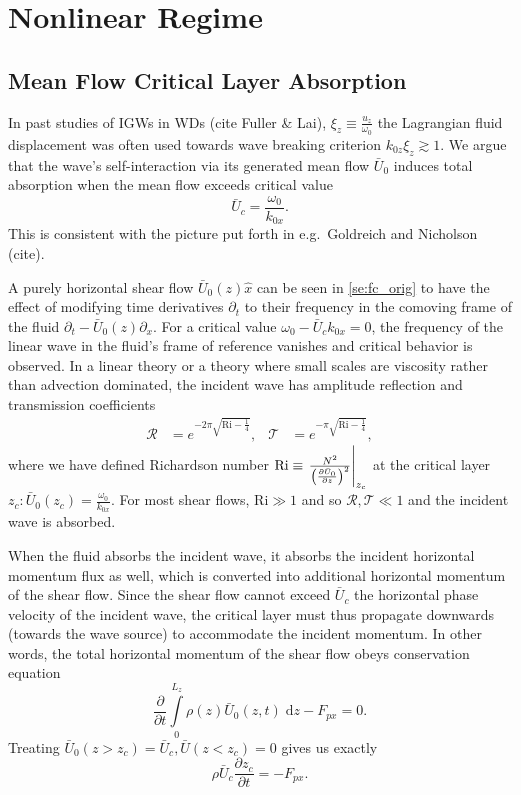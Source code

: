\documentclass[twocolumn,
        nofootinbib,
        usenames, %
        dvipsnames %
    ]{revtex4-1}%
\newcommand*{\pd}[2]{\frac{\partial#1}{\partial#2}}
\newcommand*{\at}[1]{\left.#1\right|}
\DeclarePairedDelimiter\p{\lparen}{\rparen}
\begin{document}
\section{Nonlinear Regime}\label{s:nonlin}

\subsection{Mean Flow Critical Layer Absorption}

In past studies of IGWs in WDs (cite Fuller \& Lai), $\xi_z \equiv
\frac{u_z}{\omega_0}$ the Lagrangian fluid displacement was often used towards
wave breaking criterion $k_{0z}\xi_z \gtrsim 1$. We argue that the wave's
self-interaction via its generated mean flow $\bar{U}_0$ induces total
absorption when the mean flow exceeds critical value
\begin{equation}
    \bar{U}_c = \frac{\omega_0}{k_{0x}}.
\end{equation}
This is consistent with the picture put forth in e.g.\ Goldreich and Nicholson
(cite).

A purely horizontal shear flow $\bar{U}_0(z) \hat{x}$ can be seen in
\autoref{se:fc_orig} to have the effect of modifying time derivatives
$\partial_t$ to their frequency in the comoving frame of the fluid $\partial_t -
\bar{U}_0(z)\partial_x$. For a critical value $\omega_0 - \bar{U}_c k_{0x} = 0$,
the frequency of the linear wave in the fluid's frame of reference vanishes and
critical behavior is observed. In a linear theory or a theory where small scales
are viscosity rather than advection dominated, the incident wave has amplitude
reflection and transmission coefficients
\begin{align}
    \mathcal{R} &= e^{-2\pi \sqrt{\mathrm{Ri} - \frac{1}{4}}}, &
    \mathcal{T} &= e^{-\pi \sqrt{\mathrm{Ri} - \frac{1}{4}}},
    \label{eq:crit_coeffs}
\end{align}
where we have defined Richardson number $\mathrm{Ri} \equiv
\at{\frac{N^2}{\p*{\pd{\bar{U}_0}{z}}^2}}_{z_c}$ at the critical layer $z_c:
\bar{U}_0(z_c) = \frac{\omega_0}{k_{0x}}$. For most shear flows, $\mathrm{Ri}
\gg 1$ and so $\mathcal{R}, \mathcal{T} \ll 1$ and the incident wave is
absorbed.

When the fluid absorbs the incident wave, it absorbs the incident horizontal
momentum flux as well, which is converted into additional horizontal momentum of
the shear flow. Since the shear flow cannot exceed $\bar{U}_c$ the horizontal
phase velocity of the incident wave, the critical layer must thus propagate
downwards (towards the wave source) to accommodate the incident momentum. In
other words, the total horizontal momentum of the shear flow obeys conservation
equation
\begin{equation}
    \pd{}{t}\int\limits_0^{L_z} \rho(z) \bar{U}_0(z, t)\;\mathrm{d}z
        - F_{px} = 0.
\end{equation}
Treating $\bar{U}_0(z > z_c) = \bar{U}_c, \bar{U}(z < z_c) = 0$ gives us exactly
\begin{equation}
    \rho \bar{U}_c\pd{z_c}{t} = -F_{px}.\label{eq:zc_anal}
\end{equation}
\end{document}
